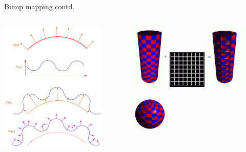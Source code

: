 \documentclass[9pt]{beamer}
\begin{document}
%
\begin{frame}{Bump mapping contd.}
	
	\begin{columns}[t]
		\begin{column}{5cm}
			\begin{center}
				\includegraphics[width=5cm]{slike/03_bump_mapping.png}
			\end{center}
		\end{column}
		\begin{column}{7cm}
			\begin{center}
				\includegraphics[width=1.8cm]{slike/bump_01.png}
				\includegraphics[width=1.8cm]{slike/bump_02.png}
				\includegraphics[width=1.8cm]{slike/bump_03.png}
			\end{center}
			\begin{center}
				\includegraphics[width=1.8cm]{slike/bump_01_01.png}

\end{center}
\end{column}
\end{columns}
\end{frame}
\end{document}
